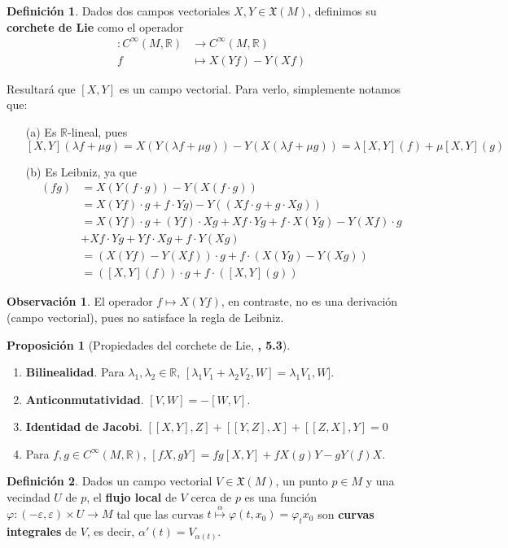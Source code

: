 \documentclass[spanish]{book}
\theoremstyle{definition}
\newtheorem*{defn}{Definición}
\newtheorem*{prop}{Proposición}
\newtheorem*{obs}{Observación}
\newcommand{\R}{\mathbb{R}}
\newcommand{\X}{\mathfrak{X}}
\newcommand{\Cinf}{C^\infty}
\begin{document}
	\begin{defn}
		Dados dos campos vectoriales $X,Y\in\X(M)$, definimos su \textbf{corchete de Lie} como el operador 
		\begin{align*}
			[X,Y]:\Cinf(M,\R)&\to\Cinf(M,\R)\\
			f&\mapsto X(Yf)-Y(Xf)
		\end{align*}
	\end{defn}
	Resultará que $[X,Y]$ es un campo vectorial. Para verlo, simplemente notamos que:
	\begin{enumerate}
		\item [(a)] Es $\R$-lineal, pues
		\[[X,Y](\lambda f+\mu g)=X(Y(\lambda f+\mu g))-Y(X(\lambda f+\mu g))=\lambda[X,Y](f)+\mu[X,Y](g)\]
		\item[(b)] Es Leibniz, ya que
		\begin{align*}
			[X,Y](fg)&=X(Y(f\cdot g))-Y(X(f\cdot g))\\
			&=X(Yf)\cdot g+f\cdot Yg)-Y((Xf\cdot g+g\cdot Xg))\\
			&=X(Yf)\cdot g+(Yf)\cdot Xg+Xf\cdot Yg+f\cdot X(Yg)-Y(Xf)\cdot g\\
			&+Xf\cdot Yg+Yf\cdot Xg+f\cdot Y(Xg)\\
			&=(X(Yf)-Y(Xf))\cdot g+f\cdot (X(Yg)-Y(Xg))\\
			&=([X,Y](f))\cdot g+f\cdot ([X,Y](g))
		\end{align*}
	\end{enumerate}
	\begin{obs}
		El operador $f\mapsto X(Yf)$, en contraste, no es una derivación (campo vectorial), pues no satisface la regla de Leibniz.
	\end{obs}
	\begin{prop}[Propiedades del corchete de Lie, \cite{DoCarmo}\textbf{, 5.3}]\leavevmode
		\begin{enumerate}
			\item \textbf{Bilinealidad}. Para $\lambda_1,\lambda_2\in\R$, $[\lambda_1V_1+\lambda_2V_2,W]=\lambda_1V_1,W]$.
			\item \textbf{Anticonmutatividad}. $[V,W]=-[W,V]$.
			\item \textbf{Identidad de Jacobi}. $[[X,Y],Z]+[[Y,Z],X]+[[Z,X],Y]=0$
			\item Para $f,g\in\Cinf(M,\R)$, $[fX,gY]=fg[X,Y]+fX(g)Y-gY(f)X$.
		\end{enumerate}
	\end{prop}
	\begin{defn}
		Dados un campo vectorial $V\in\X(M)$, un punto $p\in M$ y una vecindad $U$ de $p$, el \textbf{flujo local} de $V$ cerca de $p$ es una función $\varphi:(-\varepsilon,\varepsilon)\times U\to M$ tal que las curvas $t\overset{\alpha}{\mapsto}\varphi(t,x_0)=\varphi_tx_0$ son \textbf{curvas integrales} de $V$, es decir, $\alpha'(t)=V_{\alpha(t)}$.
	\end{defn}
\end{document}
